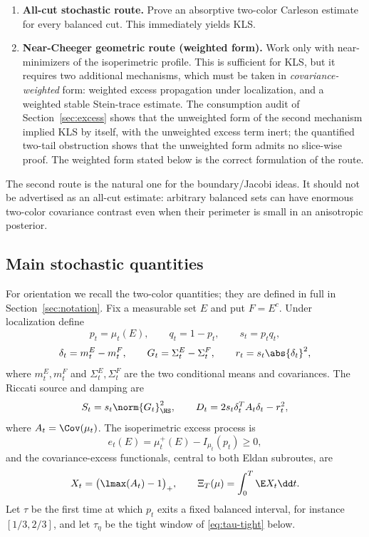 \documentclass[../../main.tex]{subfiles}
\begin{document}
\begin{enumerate}[label=\textbf{Eldan--\Alph*.},leftmargin=2.8em]
  \item \textbf{All-cut stochastic route.}  Prove an absorptive two-color Carleson estimate for
  every balanced cut. This immediately yields KLS.

  \item \textbf{Near-Cheeger geometric route (weighted form).}  Work only with near-minimizers of
  the isoperimetric profile. This is sufficient for KLS, but it requires two additional
  mechanisms, which must be taken in \emph{covariance-weighted}
  form: weighted excess propagation under localization, and a weighted stable Stein-trace
  estimate. The consumption audit of Section~\ref{sec:excess} shows that the unweighted form of
  the second mechanism implied KLS by itself, with the unweighted excess term
  inert; the quantified two-tail obstruction shows that the unweighted form admits no slice-wise
  proof. The weighted form stated below is the correct formulation of the route.
\end{enumerate}

The second route is the natural one for the boundary/Jacobi ideas. It should not be advertised as
an all-cut estimate: arbitrary balanced sets can have enormous two-color covariance contrast even
when their perimeter is small in an anisotropic posterior.

\subsection{Main stochastic quantities}

For orientation we recall the two-color quantities; they are defined in full in
Section~\ref{sec:notation}. Fix a measurable set $E$ and put $F=E^c$. Under localization define
\[
  p_t=\mu_t(E),\qquad q_t=1-p_t,
  \qquad s_t=p_tq_t,
\]
\[
  \delta_t=m_t^E-m_t^F,
  \qquad G_t=\Sigma_t^E-\Sigma_t^F,
  \qquad r_t=s_t\abs{\delta_t}^2,
\]
where $m_t^E,m_t^F$ and $\Sigma_t^E,\Sigma_t^F$ are the two conditional means and covariances. The
Riccati source and damping are
\[
  S_t=s_t\norm{G_t}_{\HS}^2,
  \qquad
  D_t=2s_t\delta_t^TA_t\delta_t-r_t^2,
\]
where $A_t=\Cov(\mu_t)$. The isoperimetric excess process is
\[
  e_t(E)=\mu_t^+(E)-I_{\mu_t}(p_t)\ge0,
\]
and the covariance-excess functionals, central to both Eldan subroutes, are
\begin{equation}\label{eq:interface-def}
  X_t=\bigl(\lmax(A_t)-1\bigr)_+,
  \qquad
  \Xi_T(\mu)=\int_0^T\E X_t\dd t .
\end{equation}
Let $\tau$ be the first time at which $p_t$ exits a fixed balanced interval, for instance
$[1/3,2/3]$, and let $\tau_\eta$ be the tight window of \eqref{eq:tau-tight} below.
\end{document}
